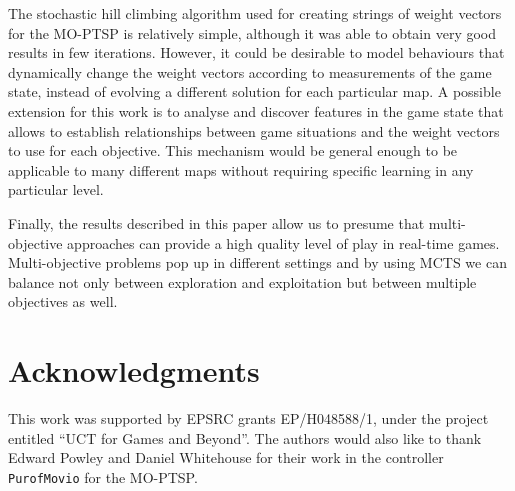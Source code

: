 \documentclass[journal]{IEEEtran}
\begin{document}
The stochastic hill climbing algorithm used for creating strings of weight vectors for the MO-PTSP is relatively simple, although it was able to obtain very good results in few iterations. However, it could be desirable to model behaviours that dynamically change the weight vectors according to measurements of the game state, instead of evolving a different solution for each particular map. A possible extension for this work is to analyse and discover features in the game state that allows to establish relationships between game situations and the weight vectors to use for each objective. This mechanism would be general enough to be applicable to many different maps without requiring specific learning in any particular level.

Finally, the results described in this paper allow us to presume that multi-objective approaches can provide a high quality level of play in real-time games. Multi-objective problems pop up in different settings and by using MCTS we can balance not only between exploration and exploitation but between multiple objectives as well. 

\section*{Acknowledgments}
This work was supported by EPSRC grants EP/H048588/1, under the project entitled ``UCT for Games and Beyond''. The authors would also like to thank Edward Powley and Daniel Whitehouse for their work in the controller \texttt{PurofMovio} for the MO-PTSP.


\ifCLASSOPTIONcaptionsoff
  \newpage
\fi





%
%
%
\end{document}
